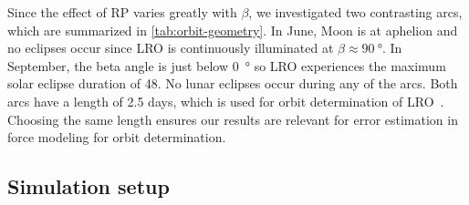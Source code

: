 Since the effect of \gls{RP} varies greatly with $\beta$, we investigated two contrasting arcs, which are summarized in \cref{tab:orbit-geometry}. In June, Moon is at aphelion and no eclipses occur since \gls{LRO} is continuously illuminated at $\beta \approx \qty{90}{\degree}$. In September, the beta angle is just below \qty{0}{\degree} so \gls{LRO} experiences the maximum solar eclipse duration of \qty{48}{\min}. No lunar eclipses occur during any of the arcs. Both arcs have a length of 2.5 days, which is used for orbit determination of \gls{LRO}~\cite{Nicholson2010,Mazarico2011}. Choosing the same length ensures our results are relevant for error estimation in force modeling for orbit determination.





\subsection{Simulation setup}
\label{subsec:simulation-setup}

